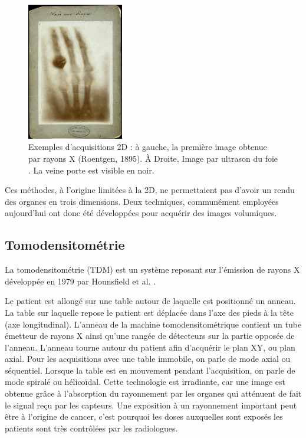 \begin{figure}
    \centering
    \includegraphics[height=6cm]{Images/first_CT.png}
    \caption{Exemples d'acquisitions 2D : à gauche, la première image obtenue par rayons X (Roentgen, 1895). À Droite, Image par ultrason du foie \protect\footnotemark. La veine porte est visible en noir.}
    \label{fig:2D imaging}
\end{figure}


Ces méthodes, à l'origine limitées à la 2D, ne permettaient pas d'avoir un rendu des organes en trois dimensions. Deux techniques, communément employées aujourd'hui ont donc été développées pour acquérir des images volumiques.

\subsection{Tomodensitométrie}
\label{sec:contexte:images:CT}

La tomodensitométrie (TDM) est un système reposant sur l'émission de rayons X développée en 1979 par Hounsfield et al. \cite{Hounsfield1995_CT_machine}.

Le patient est allongé sur une table autour de laquelle est positionné un anneau. La table sur laquelle repose le patient est déplacée dans l'axe des pieds à la tête (axe longitudinal). L'anneau de la machine tomodensitométrique contient un tube émetteur de rayons X ainsi qu'une rangée de détecteurs sur la partie opposée de l'anneau. L'anneau tourne autour du patient afin d'acquérir le plan XY, ou plan axial. Pour les acquisitions avec une table immobile, on parle de mode axial ou séquentiel. Lorsque la table est en mouvement pendant l'acquisition, on parle de mode spiralé ou hélicoïdal. Cette technologie est irradiante, car une image est obtenue grâce à l'absorption du rayonnement par les organes qui atténuent de fait le signal reçu par les capteurs.  Une exposition à un rayonnement important peut être à l'origine de cancer, c'est pourquoi les doses auxquelles sont exposés les patients sont très contrôlées par les radiologues.

